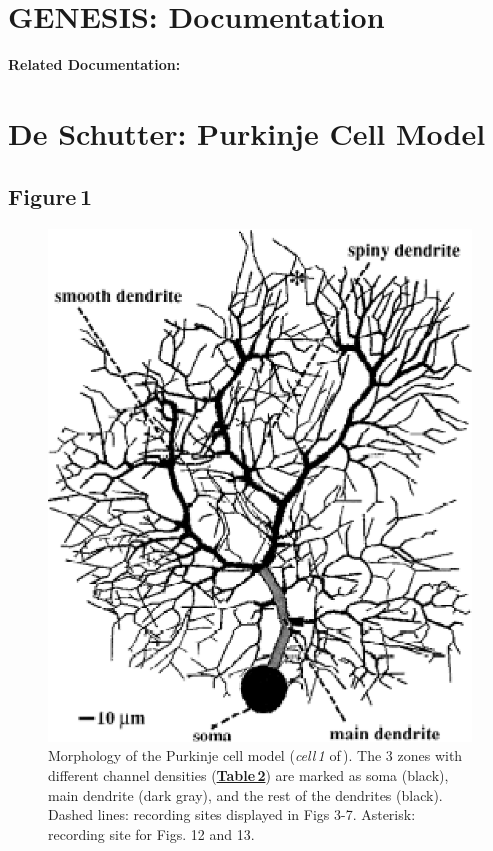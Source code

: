 \documentclass[12pt]{article}
\begin{document}
\section*{GENESIS: Documentation}

{\bf Related Documentation:}

\section*{De Schutter: Purkinje Cell Model}

\subsection*{Figure\,1}

\begin{figure}[h]
\centering
   \includegraphics[scale=0.6]{figures/Fig.1.1.eps}
   \caption{Morphology of the Purkinje cell model ({\it cell\,1} of\,\cite{Rapp-P:1994qf}).  The 3 zones with different channel densities (\href{../pub-purkinje-deschutter1-table2/pub-purkinje-deschutter1-table2.tex}{\bf Table\,2}) are marked
as soma (black), main dendrite (dark gray), and the rest of the dendrites
(black). Dashed lines: recording sites displayed in Figs 3-7. Asterisk: recording
site for Figs. 12 and 13.}
   \label{fig:DS1.1}
\end{figure}



\end{document}
